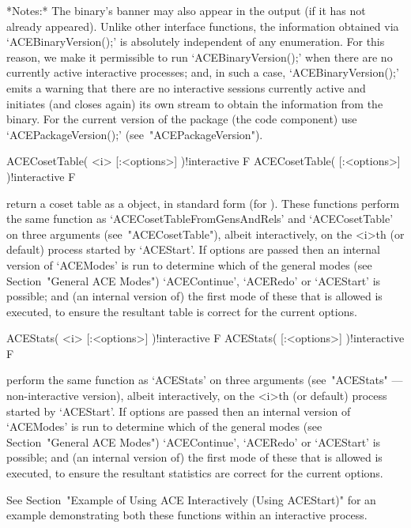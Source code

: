 *Notes:*
The {\ACE} binary's banner may also appear in the output  (if  it  has
not already appeared). Unlike other {\ACE}  interface  functions,  the
information   obtained   via   `ACEBinaryVersion();'   is   absolutely
independent  of  any  enumeration.  For  this  reason,  we   make   it
permissible to run `ACEBinaryVersion();' when there are  no  currently
active  interactive  {\ACE}  processes;   and,   in   such   a   case,
`ACEBinaryVersion();' emits a warning that there  are  no  interactive
{\ACE} sessions currently active and initiates (and closes again)  its
own stream to obtain the information from the {\ACE} binary.  For  the
current version of the {\ACE} package (the {\GAP} code component)  use
`ACEPackageVersion();' (see~"ACEPackageVersion").


\>ACECosetTable( <i> [:<options>] )!{interactive} F
\>ACECosetTable( [:<options>] )!{interactive} F

return a coset table  as  a  {\GAP}  object,  in  standard  form  (for
{\GAP}).   These   functions   perform   the    same    function    as
`ACECosetTableFromGensAndRels' and `ACECosetTable' on three  arguments
(see~"ACECosetTable"), albeit interactively, on the <i>th (or default)
process started by `ACEStart'. If options are passed then an  internal
version of `ACEModes' is run to determine which of the general  {\ACE}
modes (see Section~"General ACE Modes")  `ACEContinue',  `ACERedo'  or
`ACEStart' is possible; and (an internal version of) the first mode of
these that is allowed is executed, to ensure the  resultant  table  is
correct for the current options.

\>ACEStats( <i> [:<options>] )!{interactive} F
\>ACEStats( [:<options>] )!{interactive} F

perform  the  same  function  as   `ACEStats'   on   three   arguments
(see~"ACEStats" --- non-interactive version), albeit interactively, on
the <i>th (or default) process started by `ACEStart'. If  options  are
passed then an internal version of  `ACEModes'  is  run  to  determine
which of the general {\ACE} modes (see  Section~"General  ACE  Modes")
`ACEContinue', `ACERedo' or `ACEStart' is possible; and  (an  internal
version of) the first mode of these that is allowed  is  executed,  to
ensure the resultant statistics are correct for the current options.

See Section~"Example of Using ACE Interactively (Using ACEStart)"  for
an example demonstrating both these functions  within  an  interactive
process.

